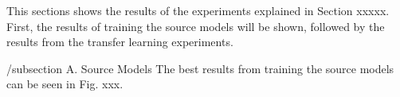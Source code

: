 This sections shows the results of the experiments explained
 in Section xxxxx. First, the results of training the source models
 will be shown, followed by the results from the transfer
 learning experiments.

 /subsection{ A. Source Models}
 The best results from training the source models can be
 seen in Fig. xxx. 
 